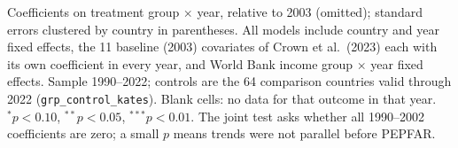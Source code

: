 \begin{table}[htbp]
\par\vspace{4pt}
\begin{minipage}{\textwidth}\footnotesize Coefficients on treatment group $\times$ year, relative to 2003 (omitted); standard errors clustered by country in parentheses. All models include country and year fixed effects, the 11 baseline (2003) covariates of Crown et al.\ (2023) each with its own coefficient in every year, and World Bank income group $\times$ year fixed effects. Sample 1990--2022; controls are the 64 comparison countries valid through 2022 (\texttt{grp\_control\_kates}). Blank cells: no data for that outcome in that year. $^{*}p<0.10$, $^{**}p<0.05$, $^{***}p<0.01$. The joint test asks whether all 1990--2002 coefficients are zero; a small $p$ means trends were not parallel before PEPFAR.\end{minipage}
\end{table}
